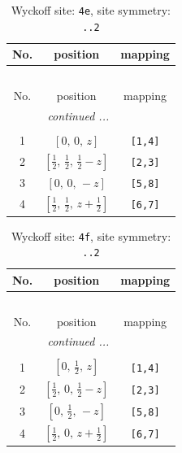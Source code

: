 \documentclass[fleqn,8pt]{jsarticle}
\begin{document}
\begin{longtable}{ccc}
\caption{Wyckoff site: {\tt 4e}, site symmetry: {\tt ..2}}
 \\
 \hline \hline
No. & position & mapping \\ \hline \endfirsthead

\multicolumn{2}{l}{\tablename\ \thetable{}} \\
 \hline \hline
No. & position & mapping \\ \hline \endhead

 \hline \hline
\multicolumn{2}{r}{\footnotesize\it continued ...} \\ \endfoot

 \hline \hline
\multicolumn{2}{r}{} \\ \endlastfoot

1 & $\left[ 0,\, 0,\, z \right]$ & {\tt [1,4]} \\ \hline
2 & $\left[ \frac{1}{2},\, \frac{1}{2},\, \frac{1}{2} - z \right]$ & {\tt [2,3]} \\ \hline
3 & $\left[ 0,\, 0,\, - z \right]$ & {\tt [5,8]} \\ \hline
4 & $\left[ \frac{1}{2},\, \frac{1}{2},\, z + \frac{1}{2} \right]$ & {\tt [6,7]} \\
\end{longtable}
\renewcommand{\arraystretch}{1.2}
\begin{longtable}{ccc}
\caption{Wyckoff site: {\tt 4f}, site symmetry: {\tt ..2}}
 \\
 \hline \hline
No. & position & mapping \\ \hline \endfirsthead

\multicolumn{2}{l}{\tablename\ \thetable{}} \\
 \hline \hline
No. & position & mapping \\ \hline \endhead

 \hline \hline
\multicolumn{2}{r}{\footnotesize\it continued ...} \\ \endfoot

 \hline \hline
\multicolumn{2}{r}{} \\ \endlastfoot

1 & $\left[ 0,\, \frac{1}{2},\, z \right]$ & {\tt [1,4]} \\ \hline
2 & $\left[ \frac{1}{2},\, 0,\, \frac{1}{2} - z \right]$ & {\tt [2,3]} \\ \hline
3 & $\left[ 0,\, \frac{1}{2},\, - z \right]$ & {\tt [5,8]} \\ \hline
4 & $\left[ \frac{1}{2},\, 0,\, z + \frac{1}{2} \right]$ & {\tt [6,7]} \\
\end{longtable}
\end{document}
